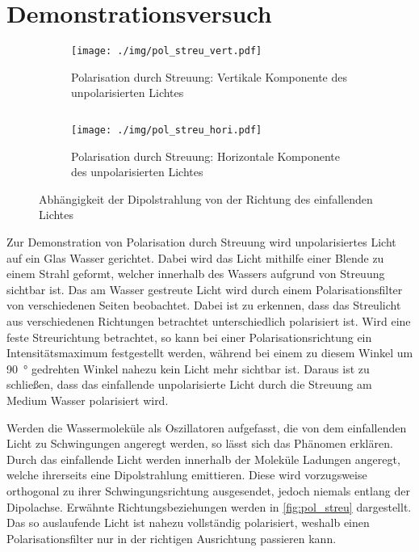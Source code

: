 \chapter{Demonstrationsversuch}
\begin{figure}[tb]
	\begin{subfigure}{.4\textwidth}
		\centering
		\texttt{[image: ./img/pol\_streu\_vert.pdf]}
		\caption[Vertikale Komponente]{Polarisation durch Streuung: Vertikale Komponente des unpolarisierten Lichtes}
	\end{subfigure}
	$\quad$
	\begin{subfigure}{.4\textwidth}
		\centering
		\texttt{[image: ./img/pol\_streu\_hori.pdf]}
		\caption[Horizontale Komponente]{Polarisation durch Streuung: Horizontale Komponente des unpolarisierten Lichtes}
	\end{subfigure}
	\caption[Visualisierung der Richtungsabhängigkeiten]{Abhängigkeit der Dipolstrahlung von der Richtung des einfallenden Lichtes}
	\label{fig:pol_streu}
\end{figure}

Zur Demonstration von Polarisation durch Streuung wird unpolarisiertes Licht auf ein Glas Wasser gerichtet.
Dabei wird das Licht mithilfe einer Blende zu einem Strahl geformt, welcher innerhalb des Wassers aufgrund von Streuung sichtbar ist.
Das am Wasser gestreute Licht wird durch einem Polarisationsfilter von verschiedenen Seiten beobachtet.
Dabei ist zu erkennen, dass das Streulicht aus verschiedenen Richtungen betrachtet unterschiedlich polarisiert ist.
Wird eine feste Streurichtung betrachtet, so kann bei einer Polarisationsrichtung ein Intensitätsmaximum festgestellt werden, während bei einem zu diesem Winkel um \SI{90}{\degree} gedrehten Winkel nahezu kein Licht mehr sichtbar ist.
Daraus ist zu schließen, dass das einfallende unpolarisierte Licht durch die Streuung am Medium Wasser polarisiert wird.

Werden die Wassermoleküle als Oszillatoren aufgefasst, die von dem einfallenden Licht zu Schwingungen angeregt werden, so lässt sich das Phänomen erklären.
Durch das einfallende Licht werden innerhalb der Moleküle Ladungen angeregt, welche ihrerseits eine Dipolstrahlung emittieren.
Diese wird vorzugsweise orthogonal zu ihrer Schwingungsrichtung ausgesendet, jedoch niemals entlang der Dipolachse.
Erwähnte Richtungsbeziehungen werden in \autoref{fig:pol_streu} dargestellt.
Das so auslaufende Licht ist nahezu vollständig polarisiert, weshalb einen Polarisationsfilter nur in der richtigen Ausrichtung passieren kann.
